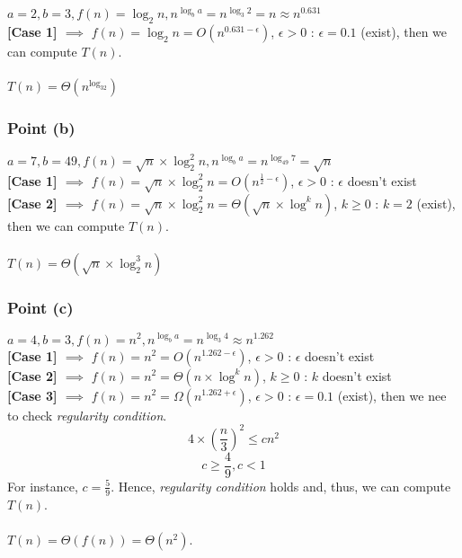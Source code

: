\documentclass{article}
\begin{document}
$a = 2, b = 3, f(n) = \log_{2}n, n^{\log_{b}a} = n^{\log_{3}2} = n \approx n^{0.631}$ \\
\textbf{[Case 1] $\implies$} $f(n) = \log_{2}n = O(n^{0.631 - \epsilon})$, $\epsilon > 0$ : $\epsilon = 0.1$ (exist), then we can compute $T(n)$. \\ \\
$T(n) = \Theta(n^{\log_32})$

\subsubsection{Point (b)}

$a = 7, b = 49, f(n) = \sqrt{n} \times \log^2_2n, n^{\log_{b}a} = n^{\log_{49}7} = \sqrt{n}$ \\
\textbf{[Case 1] $\implies$} $f(n) = \sqrt{n} \times \log^2_2n = O(n^{\frac{1}{2} - \epsilon})$, $\epsilon > 0$ : $\epsilon$ doesn't exist \\
\textbf{[Case 2] $\implies$} $f(n) = \sqrt{n} \times \log^2_2n = \Theta(\sqrt{n} \times \log^k{n})$, $k \geq 0$ : $k = 2$ (exist), then we can compute $T(n)$. \\ \\
$T(n) = \Theta(\sqrt{n} \times \log^{3}_{2}n)$

\subsubsection{Point (c)}

$a = 4, b = 3, f(n) = n^2, n^{\log_{b}a} = n^{\log_{3}4} \approx n^{1.262}$ \\
\textbf{[Case 1] $\implies$} $f(n) = n^2 = O(n^{1.262 - \epsilon})$, $\epsilon > 0$ : $\epsilon$ doesn't exist \\
\textbf{[Case 2] $\implies$} $f(n) = n^2 = \Theta(n\times \log^k{n})$, $k \geq 0$ : $k$ doesn't exist \\
\textbf{[Case 3] $\implies$} $f(n) = n^2 = \Omega(n^{1.262 + \epsilon})$, $\epsilon > 0$ : $\epsilon = 0.1$ (exist), then we nee to check \textit{regularity condition}. \\
\setcounter{equation}{0}
\begin{equation}
    4\times (\frac{n}{3})^2 \leq cn^2
\end{equation}
\begin{equation}
    c \geq \frac{4}{9}, c < 1
\end{equation}
For instance, $c = \frac{5}{9}$. Hence, \textit{regularity condition} holds and, thus, we can compute $T(n)$. \\ \\
$T(n) = \Theta(f(n)) = \Theta(n^2)$.
\end{document}
